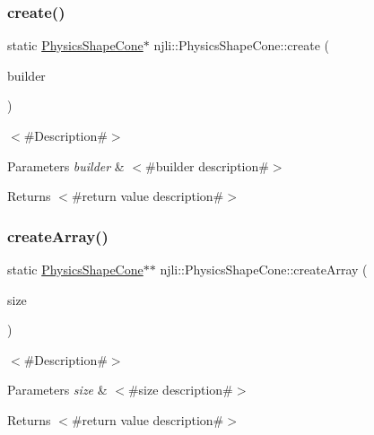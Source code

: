 \subsubsection{\texorpdfstring{create()}{create()}\hspace{0.1cm}{\footnotesize\ttfamily [2/2]}}
{\footnotesize\ttfamily static \mbox{\hyperlink{classnjli_1_1_physics_shape_cone}{Physics\+Shape\+Cone}}$\ast$ njli\+::\+Physics\+Shape\+Cone\+::create (\begin{DoxyParamCaption}\item[{const \mbox{\hyperlink{classnjli_1_1_physics_shape_cone_builder}{Physics\+Shape\+Cone\+Builder}} \&}]{builder }\end{DoxyParamCaption})\hspace{0.3cm}{\ttfamily [static]}}

$<$\#\+Description\#$>$


\begin{DoxyParams}{Parameters}
{\em builder} & $<$\#builder description\#$>$\\
\hline
\end{DoxyParams}
\begin{DoxyReturn}{Returns}
$<$\#return value description\#$>$ 
\end{DoxyReturn}
\mbox{\label{classnjli_1_1_physics_shape_cone_a53bbad7291cfc99b45a4b755eb853dc3}} 
\subsubsection{\texorpdfstring{create\+Array()}{createArray()}}
{\footnotesize\ttfamily static \mbox{\hyperlink{classnjli_1_1_physics_shape_cone}{Physics\+Shape\+Cone}}$\ast$$\ast$ njli\+::\+Physics\+Shape\+Cone\+::create\+Array (\begin{DoxyParamCaption}\item[{const \mbox{\hyperlink{_util_8h_a10e94b422ef0c20dcdec20d31a1f5049}{u32}}}]{size }\end{DoxyParamCaption})\hspace{0.3cm}{\ttfamily [static]}}

$<$\#\+Description\#$>$


\begin{DoxyParams}{Parameters}
{\em size} & $<$\#size description\#$>$\\
\hline
\end{DoxyParams}
\begin{DoxyReturn}{Returns}
$<$\#return value description\#$>$ 
\end{DoxyReturn}
\mbox{\label{classnjli_1_1_physics_shape_cone_a91510476813e2e6d113cf4955035741a}} 
